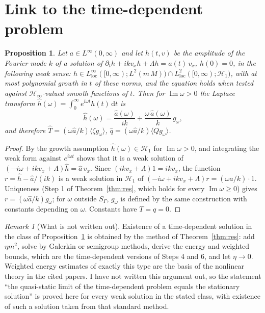 \documentclass[11pt]{article}
\newcommand{\dd}{\mathrm{d}}
\newcommand{\cH}{\mathcal{H}}
\newcommand{\avg}[1]{\langle #1\rangle}
\renewcommand{\Im}{\operatorname{Im}}
\newtheorem{proposition}[theorem]{Proposition}
\theoremstyle{remark}
\newtheorem{remark}[theorem]{Remark}
\begin{document}
\section{Link to the time-dependent problem}

\begin{proposition}\label{prop:time}
Let $a\in L^\infty(0,\infty)$ and let $h(t,v)$ be the amplitude of the
Fourier mode $k$ of a solution of
$\partial_th+ikv_xh+\Lambda h=a(t)\,v_x$, $h(0)=0$, in the following weak
sense: $h\in L^\infty_{\mathrm{loc}}([0,\infty);L^2(m\,M))\cap
L^2_{\mathrm{loc}}([0,\infty);\cH_1)$, with at most polynomial growth in $t$
of these norms, and the equation holds when tested against
$\cH_\infty$-valued smooth functions of $t$. Then for $\Im\omega>0$ the
Laplace transform $\hat h(\omega)=\int_0^\infty e^{i\omega t}h(t)\,\dd t$ is
\[
  \hat h(\omega)=\frac{\hat a(\omega)}{ik}
  +\frac{\omega\,\hat a(\omega)}{k}\,g_\omega ,
\]
and therefore $\hat T=(\omega\hat a/k)\avg{\zeta g_\omega}$,
$\hat q=(\omega\hat a/k)\avg{Qg_\omega}$.
\end{proposition}

\begin{proof}
By the growth assumption $\hat h(\omega)\in\cH_1$ for $\Im\omega>0$, and
integrating the weak form against $e^{i\omega t}$ shows that it is a weak
solution of $(-i\omega+ikv_x+\Lambda)\hat h=\hat a\,v_x$. Since
$(ikv_x+\Lambda)1=ikv_x$, the function
$r=\hat h-\hat a/(ik)$ is a weak solution in $\cH_1$ of
$(-i\omega+ikv_x+\Lambda)r=(\omega\hat a/k)\cdot1$. Uniqueness (Step 1 of
Theorem~\ref{thm:res}, which holds for every $\Im\omega\ge0$) gives
$r=(\omega\hat a/k)g_\omega$; for $\omega$ outside $S_\Gamma$, $g_\omega$ is
defined by the same construction with constants depending on $\omega$.
Constants have $T=q=0$.
\end{proof}

\begin{remark}[What is not written out]
Existence of a time-dependent solution in the class of
Proposition~\ref{prop:time} is obtained by the method of
Theorem~\ref{thm:res}: add $\eta m^2$, solve by Galerkin or semigroup
methods, derive the energy and weighted bounds, which are the time-dependent
versions of Steps 4 and 6, and let $\eta\to0$. Weighted energy estimates of
exactly this type are the basis of the nonlinear theory in the cited papers.
I have not written this argument out, so the statement ``the quasi-static
limit of the time-dependent problem equals the stationary solution'' is
proved here for every weak solution in the stated class, with existence of
such a solution taken from that standard method.
\end{remark}
\end{document}
